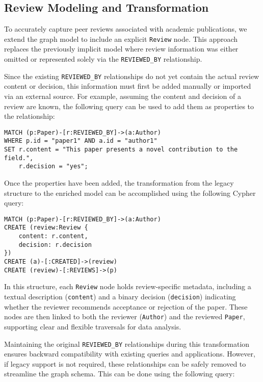 \documentclass{article}
\begin{document}
\subsection*{Review Modeling and Transformation}

To accurately capture peer reviews associated with academic publications, we extend the graph model to include an explicit \texttt{Review} node. This approach replaces the previously implicit model where review information was either omitted or represented solely via the \texttt{REVIEWED\_BY} relationship.

Since the existing \texttt{REVIEWED\_BY} relationships do not yet contain the actual review content or decision, this information must first be added manually or imported via an external source. For example, assuming the content and decision of a review are known, the following query can be used to add them as properties to the relationship:

\begin{verbatim}
MATCH (p:Paper)-[r:REVIEWED_BY]->(a:Author)
WHERE p.id = "paper1" AND a.id = "author1"
SET r.content = "This paper presents a novel contribution to the field.",
    r.decision = "yes";
\end{verbatim}

Once the properties have been added, the transformation from the legacy structure to the enriched model can be accomplished using the following Cypher query: 



\begin{verbatim}
MATCH (p:Paper)-[r:REVIEWED_BY]->(a:Author)
CREATE (review:Review {
    content: r.content, 
    decision: r.decision
})
CREATE (a)-[:CREATED]->(review)
CREATE (review)-[:REVIEWS]->(p)
\end{verbatim}

In this structure, each \texttt{Review} node holds review-specific metadata, including a textual description (\texttt{content}) and a binary decision (\texttt{decision}) indicating whether the reviewer recommends acceptance or rejection of the paper. These nodes are then linked to both the reviewer (\texttt{Author}) and the reviewed \texttt{Paper}, supporting clear and flexible traversals for data analysis.

Maintaining the original \texttt{REVIEWED\_BY} relationships during this transformation ensures backward compatibility with existing queries and applications. However, if legacy support is not required, these relationships can be safely removed to streamline the graph schema. This can be done using the following query:
\end{document}
